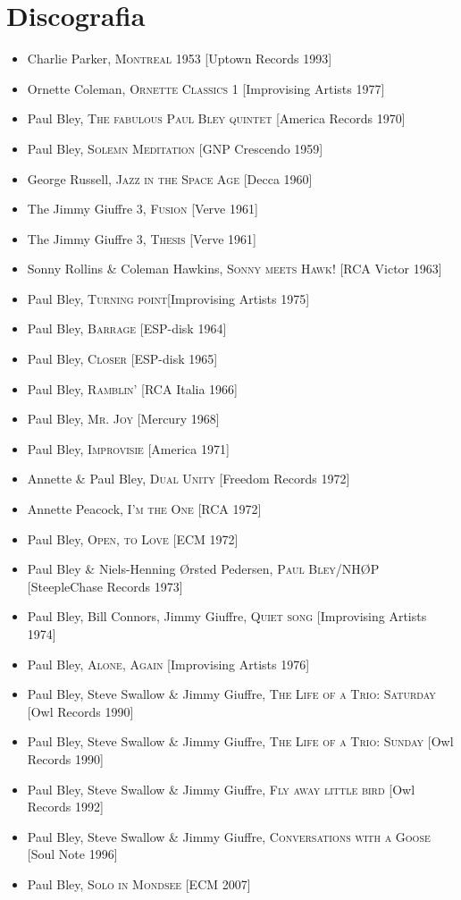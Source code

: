 \chapter*{Discografia}
\begin{itemize}
	\item Charlie Parker, \textsc{Montreal 1953} [Uptown Records 1993]
	\item Ornette Coleman, \textsc{Ornette Classics 1} [Improvising Artists 1977]
	\item Paul Bley, \textsc{The fabulous Paul Bley quintet} [America Records 1970]
	\item Paul Bley, \textsc{Solemn Meditation} [GNP Crescendo 1959]
	\item George Russell, \textsc{Jazz in the Space Age} [Decca 1960]
	\item The Jimmy Giuffre 3, \textsc{Fusion} [Verve 1961]
	\item The Jimmy Giuffre 3, \textsc{Thesis} [Verve 1961]
	\item Sonny Rollins \& Coleman Hawkins, \textsc{Sonny meets Hawk!} [RCA Victor 1963]
	\item Paul Bley, \textsc{Turning point}[Improvising Artists 1975]
	\item Paul Bley, \textsc{Barrage} [ESP-disk 1964] 
	\item Paul Bley, \textsc{Closer} [ESP-disk 1965] 
	\item Paul Bley, \textsc{Ramblin'} [RCA Italia 1966]
	\item Paul Bley, \textsc{Mr. Joy} [Mercury 1968]
	\item Paul Bley, \textsc{Improvisie} [America 1971]
	\item Annette \& Paul Bley, \textsc{Dual Unity} [Freedom Records 1972]
	\item Annette Peacock, \textsc{I'm the One} [RCA 1972]
	\item Paul Bley, \textsc{Open, to Love} [ECM 1972]
	\item Paul Bley \& Niels-Henning Ørsted Pedersen, \textsc{Paul Bley/NHØP} [SteepleChase Records 1973]
	\item Paul Bley, Bill Connors, Jimmy Giuffre, \textsc{Quiet song} [Improvising Artists 1974]
	\item Paul Bley, \textsc{Alone, Again} [Improvising Artists 1976]
	\item Paul Bley, Steve Swallow \& Jimmy Giuffre, \textsc{The Life of a Trio: Saturday} [Owl Records 1990]
	\item Paul Bley, Steve Swallow \& Jimmy Giuffre, \textsc{The Life of a Trio: Sunday} [Owl Records 1990]
	\item Paul Bley, Steve Swallow \& Jimmy Giuffre, \textsc{Fly away little bird} [Owl Records 1992]
	\item Paul Bley, Steve Swallow \& Jimmy Giuffre, \textsc{Conversations with a Goose} [Soul Note 1996]
	\item Paul Bley, \textsc{Solo in Mondsee} [ECM 2007]
\end{itemize}